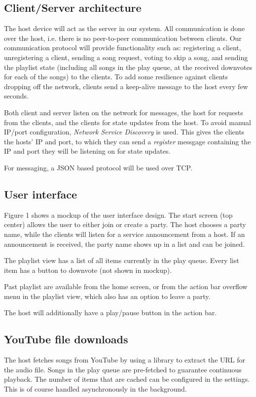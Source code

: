 \documentclass{report}
\begin{document}
\subsection{Client/Server architecture}
The host device will act as the server in our system. All communication is
done over the host, i.e. there is no peer-to-peer communication between
clients. Our communication protocol will provide functionality such as:
registering a client, unregistering a client, sending a song request,
voting to skip a song, and sending the playlist state (including all songs
in the play queue, at the received downvotes for each of the songs) to the clients.
To add some resilience against clients dropping off the network,
clients send a keep-alive message to the host every few seconds.

Both client and server listen on the network for messages,
the host for requests from the clients, and the clients for state updates
from the host. To avoid manual IP/port configuration, \emph{Network Service Discovery}
\cite{nsd} is used. This gives the clients the hosts' IP and port,
to which they can send a \emph{register} messgage containing the IP and port they
will be listening on for state updates.

For messaging, a JSON based protocol will be used over TCP.

\subsection{User interface}
Figure 1 shows a mockup of the user interface design. The start screen
(top center) allows the user to either join or create a party. The host chooses
a party name, while the clients will listen for a service announcement
from a host. If an announcement is received, the party name shows up
in a list and can be joined.

The playlist view has a list of all items currently in the play queue.
Every list item has a button to downvote (not shown in mockup).

Past playlist are available from the home screen, or from the action bar
overflow menu in the playlist view, which also has an option to leave a party.

The host will additionally have a play/pause button in the action bar.

\subsection{YouTube file downloads}
The host fetches songs from YouTube by using a library \cite{youtubeExtractor}
to extract the URL for the audio file. Songs in the play queue are pre-fetched
to guarantee continuous playback. The number of items that are cached can be
configured in the settings. This is of course handled asynchronously in
the background.
\end{document}
